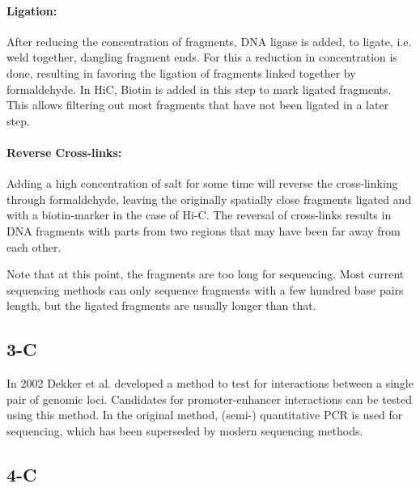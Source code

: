 \paragraph{Ligation:}\label{sec:ligation}
After reducing the concentration of fragments, DNA ligase is added, to ligate,
i.e. weld together, dangling fragment ends. For this a reduction in
concentration is done, resulting in favoring the ligation of fragments linked
together by formaldehyde.
In HiC, Biotin is added in this step to mark ligated fragments. This allows
filtering out most fragments that have not been ligated in a later step.




\paragraph{Reverse Cross-links:}\label{sec:revcrosslink}
Adding a high concentration of salt for some time will reverse the
cross-linking through formaldehyde, leaving the originally spatially close
fragments ligated and with a biotin-marker in the case of Hi-C.
The reversal of cross-links results in DNA fragments with parts from two
regions that may have been far away from each other.

Note that at this point, the fragments are too long for sequencing. Most
current sequencing methods can only sequence fragments with a few hundred base
pairs length, but the ligated fragments are usually longer than that.



\subsection{3-C}\label{sec:3C}

In 2002 Dekker et al. \cite{dekker2002capturing} developed a method to test for
interactions between a single pair of genomic loci. Candidates for
promoter-enhancer interactions can be tested using this method.
In the original method, (semi-) quantitative PCR is used for sequencing, which
has been superseded by modern sequencing methods.


\subsection{4-C}\label{sec:4C}

